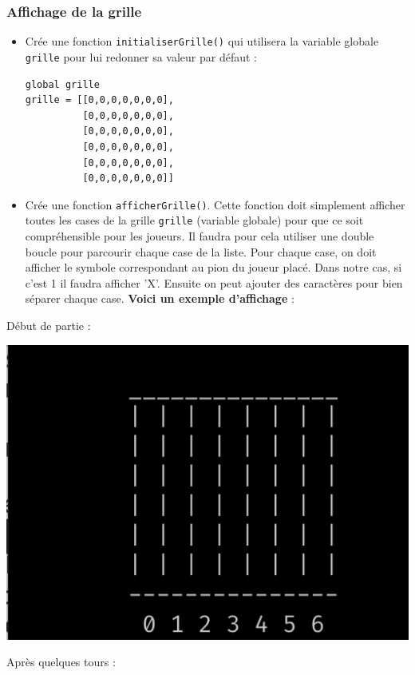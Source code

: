 \documentclass[11pt]{article}
\begin{document}
\subsubsection*{Affichage de la grille}
\label{sec:orgee830a9}
\begin{itemize}
\item Crée une fonction \texttt{initialiserGrille()} qui utilisera la variable globale \texttt{grille} pour lui redonner sa valeur par défaut :
\begin{verbatim}
global grille
grille = [[0,0,0,0,0,0,0],
          [0,0,0,0,0,0,0],
          [0,0,0,0,0,0,0],
          [0,0,0,0,0,0,0],
          [0,0,0,0,0,0,0],
          [0,0,0,0,0,0,0]]
\end{verbatim}

\item Crée une fonction \texttt{afficherGrille()}. Cette fonction doit simplement afficher toutes les cases de la grille \texttt{grille} (variable globale) pour que ce soit compréhensible pour les joueurs. Il faudra pour cela utiliser une double boucle pour parcourir chaque \og case\fg{} de la liste. Pour chaque case, on doit afficher le symbole correspondant au pion du joueur placé. Dans notre cas, si c'est 1 il faudra afficher 'X'.
Ensuite on peut ajouter des caractères pour bien séparer chaque case. \textbf{Voici un exemple d'affichage} :
\end{itemize}

Début de partie :

\begin{center}
\includegraphics[width=.9\linewidth]{./img/exemple_vide.png}
\end{center}

Après quelques tours :
\end{document}
